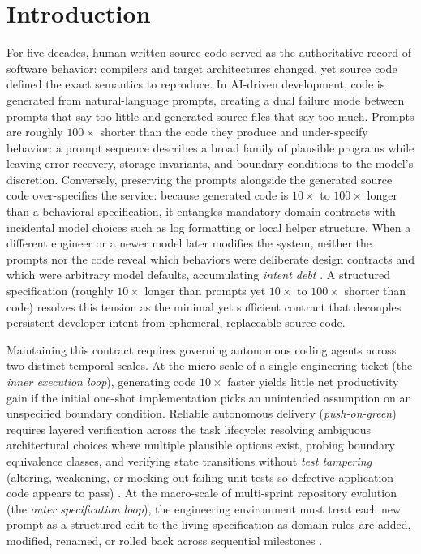 \documentclass[11pt,a4paper,copyright]{google}
\begin{document}
\section{Introduction}
\label{sec:intro}

For five decades, human-written source code served as the authoritative record of software behavior: compilers and target architectures changed, yet source code defined the exact semantics to reproduce. In AI-driven development, code is generated from natural-language prompts, creating a dual failure mode between prompts that say too little and generated source files that say too much. Prompts are roughly $100\times$ shorter than the code they produce and under-specify behavior: a prompt sequence describes a broad family of plausible programs while leaving error recovery, storage invariants, and boundary conditions to the model's discretion. Conversely, preserving the prompts alongside the generated source code over-specifies the service: because generated code is $10\times$ to $100\times$ longer than a behavioral specification, it entangles mandatory domain contracts with incidental model choices such as log formatting or local helper structure. When a different engineer or a newer model later modifies the system, neither the prompts nor the code reveal which behaviors were deliberate design contracts and which were arbitrary model defaults, accumulating \emph{intent debt} \cite{storey2026intent}. A structured specification (roughly $10\times$ longer than prompts yet $10\times$ to $100\times$ shorter than code) resolves this tension as the minimal yet sufficient contract that decouples persistent developer intent from ephemeral, replaceable source code.

Maintaining this contract requires governing autonomous coding agents across two distinct temporal scales. At the micro-scale of a single engineering ticket (the \emph{inner execution loop}), generating code $10\times$ faster yields little net productivity gain if the initial one-shot implementation picks an unintended assumption on an unspecified boundary condition. Reliable autonomous delivery (\emph{push-on-green}) requires layered verification across the task lifecycle: resolving ambiguous architectural choices where multiple plausible options exist, probing boundary equivalence classes, and verifying state transitions without \emph{test tampering} (altering, weakening, or mocking out failing unit tests so defective application code appears to pass) \cite{yao2023react,jimenez2024swebench,mundler2024swtbench,zhuo2024bigcodebench,liu2023evalplus,yang2024sweagent,wang2024openhands,xia2024agentless,denison2024sycophancy}. At the macro-scale of multi-sprint repository evolution (the \emph{outer specification loop}), the engineering environment must treat each new prompt as a structured edit to the living specification as domain rules are added, modified, renamed, or rolled back across sequential milestones \cite{parnas1972criteria,brooks1987nosilver,zhao2024commit0,le2025sweevo,storey2026intent}.
\end{document}
